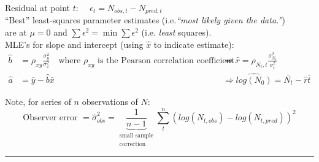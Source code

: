 \documentclass{article}
\newcommand{\ind}{\-\hspace{1cm}}
\begin{document}
Residual at point $t$: $\quad \epsilon_t = N_{obs,t} - N_{pred,t}$\\

``Best'' least-squares parameter estimates (i.e.\emph{``most likely given the data.''})\\
\ind are at $\mu = 0$ and $\sum\epsilon^2 = \min{\sum\epsilon^2}$ (i.e. \emph{least} squares).\\

MLE's for slope and intercept (using $\hat{x}$ to indicate estimate):
\begin{align*}
	\hat{b} &= \rho_{xy}\frac{\sigma^2_y}{\sigma^2_x} \quad \text{where } \rho_{xy} \text{ is the Pearson correlation coefficient.} \quad &\Rightarrow \hat{r} = \rho_{N_t,t}\frac{ \sigma^2_{N_t}}{\sigma^2_t}\\
	\hat{a} &= \bar{y}-\hat{b}\bar{x} &\Rightarrow \widehat{log(N_0)} = \bar{N_t} - \hat{r} \bar{t}
\end{align*}

Note, for series of $n$ observations of $N$:
\begin{equation*}
\text{Observer error } = \hat{\sigma}_{obs}^2 = \underbrace{\frac{1}{n-1}}_{\substack{\text{small sample}\\ \text{correction}}} \sum_t^n\left(log(N_{t,obs}) - log(N_{t,pred})\right)^2
\end{equation*}

\rule[0.5ex]{\linewidth}{1pt}
\end{document}
